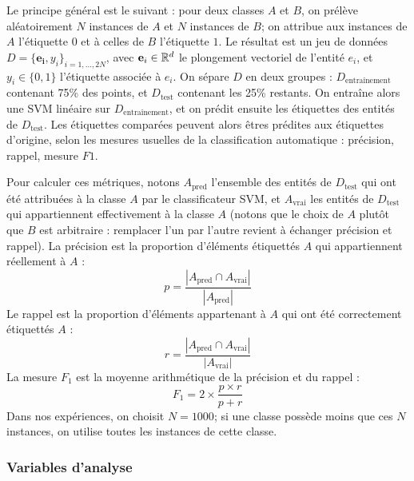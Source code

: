 Le principe général est le suivant : pour deux classes $A$ et $B$, on prélève aléatoirement $N$ instances de $A$ et $N$ instances de $B$; on attribue aux instances de $A$ l'étiquette $0$ et à celles de $B$ l'étiquette $1$. Le résultat est un jeu de données $D = \{\mathbf{e_i}, y_i \}_{i=1, \ldots, 2N}$, avec $\mathbf{e}_i \in \mathbb{R}^d$ le plongement vectoriel de l'entité $e_i$, et $y_i \in \{ 0, 1\}$ l'étiquette associée à $e_i$. 
On sépare $D$ en deux groupes : $D_\textrm{entraînement}$ contenant 75\% des points, et $D_\textrm{test}$ contenant les 25\% restants. On entraîne alors une SVM linéaire sur $D_\textrm{entraînement}$, et on prédit ensuite les étiquettes des entités de $D_\textrm{test}$.
Les étiquettes comparées peuvent alors êtres prédites aux étiquettes d'origine, selon les mesures usuelles de la classification automatique : précision, rappel, mesure $F1$. 

Pour calculer ces métriques, notons $A_\textrm{pred}$ l'ensemble des entités de $D_\textrm{test}$ qui ont été attribuées à la classe $A$ par le classificateur SVM, et $A_\textrm{vrai}$ les entités de $D_\textrm{test}$ qui appartiennent effectivement à la classe $A$ (notons que le choix de $A$ plutôt que $B$ est arbitraire : remplacer l'un par l'autre revient à échanger précision et rappel).
La précision est la proportion d'éléments étiquettés $A$ qui appartiennent réellement à $A$ :
\begin{equation*}
    p = \frac{|A_\textrm{pred} \cap A_\textrm{vrai}|}{|A_\textrm{pred}|}
\end{equation*}
Le rappel est la proportion d'éléments appartenant à $A$ qui ont été correctement étiquettés $A$ :
\begin{equation*}
    r = \frac{|A_\textrm{pred} \cap A_\textrm{vrai}|}{|A_\textrm{vrai}|}
\end{equation*}
La mesure $F_1$ est la moyenne arithmétique de la précision et du rappel :
\begin{equation*}
    F_1 = 2 \times \frac{p \times r}{p + r}
\end{equation*}
Dans nos expériences, on choisit $N=1000$; si une classe possède moins que ces $N$ instances, on utilise toutes les instances de cette classe.

\subsubsection{Variables d'analyse}

